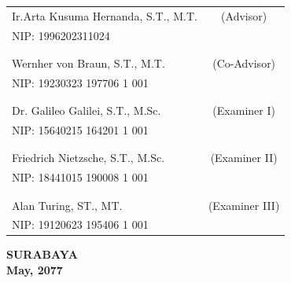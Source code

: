     \noindent
    \begin{tabularx}{\textwidth}{X c}
      Ir.Arta Kusuma Hernanda, S.T., M.T.          & (Advisor) \\
      NIP: 1996202311024        & \\
      &  \\
      &  \\
      Wernher von Braun, S.T., M.T.     & (Co-Advisor) \\
      NIP: 19230323 197706 1 001        & \\
      &  \\
      &  \\
      Dr. Galileo Galilei, S.T., M.Sc.  & (Examiner I) \\
      NIP: 15640215 164201 1 001        & \\
      &  \\
      &  \\
      Friedrich Nietzsche, S.T., M.Sc.  & (Examiner II) \\
      NIP: 18441015 190008 1 001        & \\
      &  \\
      &  \\
      Alan Turing, ST., MT.             & (Examiner III) \\
      NIP: 19120623 195406 1 001        & \\
    \end{tabularx}
  \endgroup

  \vspace{4ex}

  \begin{center}
    \textbf{SURABAYA} \\
    \textbf{May, 2077}
  \end{center}
\endgroup

